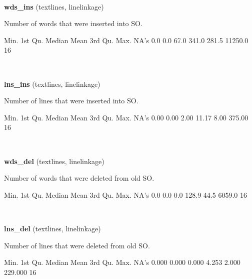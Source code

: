\documentclass[]{article}
\newenvironment{Shaded}{\begin{snugshade}}{\end{snugshade}}
\newcommand{\StringTok}[1]{\textcolor[rgb]{0.31,0.60,0.02}{{#1}}}
\newcommand{\NormalTok}[1]{{#1}}
\begin{document}
~

\vspace{1em}

\textbf{wds\_ins} (textlines, linelinkage)

Number of words that were inserted into SO.

\begin{Shaded}
\begin{Highlighting}[]
   \NormalTok{Min. 1st Qu.  Median    Mean 3rd Qu.    Max.    NA}\StringTok{'s }
\StringTok{    0.0     0.0    67.0   341.0   281.5 11250.0      16 }
\end{Highlighting}
\end{Shaded}

~

\vspace{1em}

\textbf{lns\_ins} (textlines, linelinkage)

Number of lines that were inserted into SO.

\begin{Shaded}
\begin{Highlighting}[]
   \NormalTok{Min. 1st Qu.  Median    Mean 3rd Qu.    Max.    NA}\StringTok{'s }
\StringTok{   0.00    0.00    2.00   11.17    8.00  375.00      16 }
\end{Highlighting}
\end{Shaded}

~

\vspace{1em}

\textbf{wds\_del} (textlines, linelinkage)

Number of words that were deleted from old SO.

\begin{Shaded}
\begin{Highlighting}[]
   \NormalTok{Min. 1st Qu.  Median    Mean 3rd Qu.    Max.    NA}\StringTok{'s }
\StringTok{    0.0     0.0     0.0   128.9    44.5  6059.0      16 }
\end{Highlighting}
\end{Shaded}

~

\vspace{1em}

\textbf{lns\_del} (textlines, linelinkage)

Number of lines that were deleted from old SO.

\begin{Shaded}
\begin{Highlighting}[]
   \NormalTok{Min. 1st Qu.  Median    Mean 3rd Qu.    Max.    NA}\StringTok{'s }
\StringTok{  0.000   0.000   0.000   4.253   2.000 229.000      16 }
\end{Highlighting}
\end{Shaded}
\end{document}
